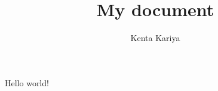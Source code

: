\documentclass[a4paper,12pt]{article}
\title{My document}
\author{Kenta Kariya}
\begin{document}
Hello world!
\end{document}
